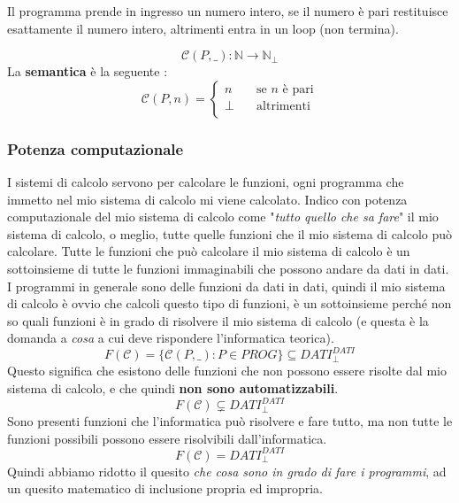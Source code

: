 \documentclass{article}
\begin{document}
Il programma prende in ingresso un numero intero, se il numero è pari restituisce
esattamente il numero intero, altrimenti entra in un loop (non termina).

$$\mathcal{C}(P,\_):\mathbb{N}\rightarrow\mathbb{N}_{\bot}$$
La \textbf{semantica} è la seguente :
\[
    \mathcal{C}(P,n) =
    \begin{cases}
        n    & \quad\text{se }n\text{ è pari} \\
        \bot & \quad\text{altrimenti}         \\
    \end{cases}
\]

\subsubsection{Potenza computazionale}
I sistemi di calcolo servono per calcolare le funzioni, ogni programma che immetto
nel mio sistema di calcolo mi viene calcolato. Indico con potenza computazionale
del mio sistema di calcolo come "\textit{tutto quello che sa fare}" il mio sistema di
calcolo, o meglio, tutte quelle funzioni che il mio sistema di calcolo può calcolare.
\newline\newline
Tutte le funzioni che può calcolare il mio sistema di calcolo è un sottoinsieme
di tutte le funzioni immaginabili che possono andare da dati in dati. I programmi
in generale sono delle funzioni da dati in dati, quindi il mio sistema di calcolo
è ovvio che calcoli questo tipo di funzioni, è un sottoinsieme perché non so quali
funzioni è in grado di risolvere il mio sistema di calcolo (e questa è la domanda
a \textit{cosa} a cui deve rispondere l'informatica teorica).
$$F(\mathcal{C})=\{\mathcal{C}(P,\_):P\in PROG\}\subseteq DATI_{\bot}^{DATI}$$
Questo significa che esistono delle funzioni che non possono essere risolte dal mio
sistema di calcolo, e che quindi \textbf{non sono automatizzabili}.
$$F(\mathcal{C})\subsetneq DATI_{\bot}^{DATI}$$
Sono presenti funzioni che l'informatica può risolvere e fare tutto, ma non tutte
le funzioni possibili possono essere risolvibili dall'informatica.
$$F(\mathcal{C})=DATI_{\bot}^{DATI}$$
Quindi abbiamo ridotto il quesito \textit{che cosa sono in grado di fare i programmi},
ad un quesito matematico di inclusione propria ed impropria.
\end{document}
